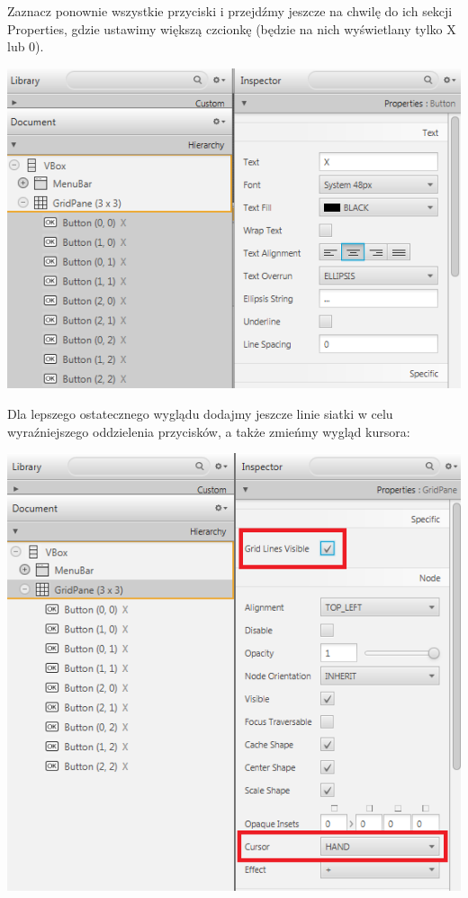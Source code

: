 \documentclass[letterpaper,10pt,english]{sphinxmanual}
\begin{document}
Zaznacz ponownie wszystkie przyciski i przejdźmy jeszcze na chwilę do ich sekcji Properties, gdzie ustawimy większą czcionkę (będzie na nich wyświetlany tylko X lub 0).

{\hfill\includegraphics{size4.png}\hfill}

Dla lepszego ostatecznego wyglądu dodajmy jeszcze linie siatki w celu wyraźniejszego oddzielenia przycisków, a także zmieńmy wygląd kursora:

{\hfill\includegraphics{size5.png}\hfill}
\end{document}
